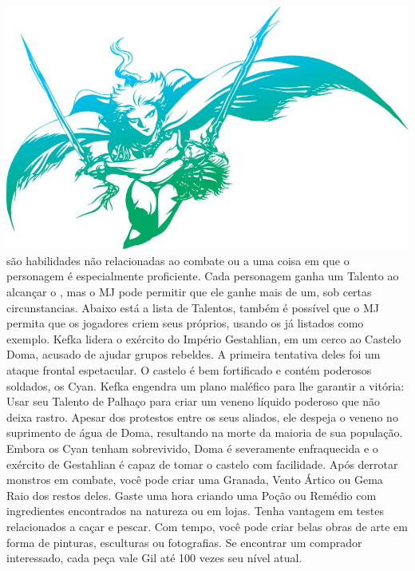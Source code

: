 %
\\
%
\includegraphics[width=\columnwidth]{./art/images/ff3.jpg}
%
\vfill
%
 são habilidades não relacionadas ao combate ou a uma coisa em que o personagem é especialmente proficiente.
Cada personagem ganha um Talento ao alcançar o , mas o MJ pode permitir que ele ganhe mais de um, sob certas circunstancias.
Abaixo está a lista de Talentos, também é possível que o MJ permita que os jogadores criem seus próprios, usando os já listados como exemplo.
%
\ofpar
%
{
	Kefka lidera o exército do Império Gestahlian, em um cerco ao Castelo Doma, acusado de ajudar grupos rebeldes.
	A primeira tentativa deles foi um ataque frontal espetacular.
	O castelo é bem fortificado e contém poderosos soldados, os Cyan.
	Kefka engendra um plano maléfico para lhe garantir a vitória:
	Usar seu Talento de Palhaço para criar um veneno líquido poderoso que não deixa rastro.
	Apesar dos protestos entre os seus aliados, ele despeja o veneno no suprimento de água de Doma, resultando na morte da maioria de sua população.
	Embora os Cyan tenham sobrevivido, Doma é severamente enfraquecida e o exército de Gestahlian é capaz de tomar o castelo com facilidade.
}	
%	
\ofpar\vfill
%
{
	Após derrotar monstros em combate, você pode criar uma Granada, Vento Ártico ou Gema Raio dos restos deles.
}
\vfill
{}
{
	Gaste uma hora criando uma Poção ou Remédio com ingredientes encontrados na natureza ou em lojas.
}
\vfill
{}
{
	Tenha vantagem em testes relacionados a caçar e pescar.
}
\vfill
{}
{
	Com tempo, você pode criar belas obras de arte em forma de pinturas, esculturas ou fotografias. 
	Se encontrar um comprador interessado, cada peça vale Gil até 100 vezes seu nível atual. 
}

